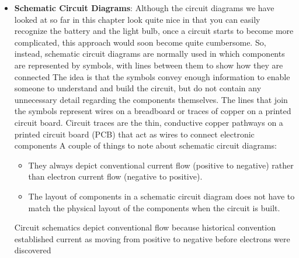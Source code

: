 \documentclass{report}
\begin{document}
\begin{itemize}
        \item \textbf{Schematic Circuit Diagrams}: Although the circuit diagrams we have looked at so far in this chapter look quite nice in that you can easily recognize the battery and the light bulb, once a circuit starts to become more complicated, this approach would soon become quite cumbersome. So, instead, schematic circuit diagrams are normally used in which components are represented by symbols, with lines between them to show how they are connected
            \bigbreak \noindent 
            The idea is that the symbols convey enough information to enable someone to understand and build the circuit, but do not contain any unnecessary detail regarding the components themselves.
            \bigbreak \noindent 
            The lines that join the symbols represent wires on a breadboard or traces of copper on a printed circuit board.
            \bigbreak \noindent 
            Circuit traces are the thin, conductive copper pathways on a printed circuit board (PCB) that act as wires to connect electronic components
            \bigbreak \noindent 
            A couple of things to note about schematic circuit diagrams:
            \begin{itemize}
                \item They always depict conventional current flow (positive to negative) rather than electron current flow (negative to positive).
                \item The layout of components in a schematic circuit diagram does not have to match the physical layout of the components when the circuit is built.
            \end{itemize}
            Circuit schematics depict conventional flow because historical convention established current as moving from positive to negative before electrons were discovered


\end{itemize}
\end{document}
